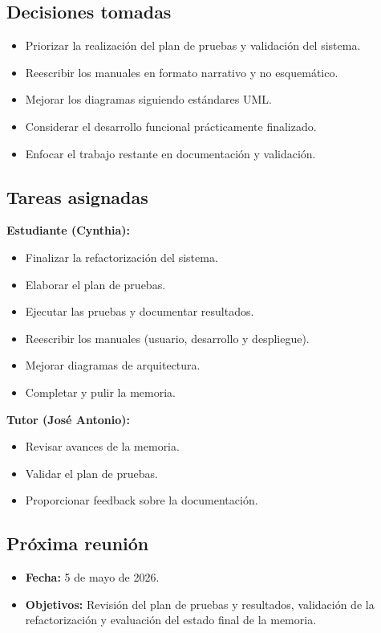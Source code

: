 \subsection*{Decisiones tomadas}
\begin{itemize}
    \item Priorizar la realización del plan de pruebas y validación del sistema.
    \item Reescribir los manuales en formato narrativo y no esquemático.
    \item Mejorar los diagramas siguiendo estándares UML.
    \item Considerar el desarrollo funcional prácticamente finalizado.
    \item Enfocar el trabajo restante en documentación y validación.
\end{itemize}

\subsection*{Tareas asignadas}

\textbf{Estudiante (Cynthia):}
\begin{itemize}
    \item Finalizar la refactorización del sistema.
    \item Elaborar el plan de pruebas.
    \item Ejecutar las pruebas y documentar resultados.
    \item Reescribir los manuales (usuario, desarrollo y despliegue).
    \item Mejorar diagramas de arquitectura.
    \item Completar y pulir la memoria.
\end{itemize}

\textbf{Tutor (José Antonio):}
\begin{itemize}
    \item Revisar avances de la memoria.
    \item Validar el plan de pruebas.
    \item Proporcionar feedback sobre la documentación.
\end{itemize}

\subsection*{Próxima reunión}
\begin{itemize}
    \item \textbf{Fecha:} 5 de mayo de 2026.
    \item \textbf{Objetivos:} Revisión del plan de pruebas y resultados, validación de la refactorización y evaluación del estado final de la memoria.
\end{itemize}

